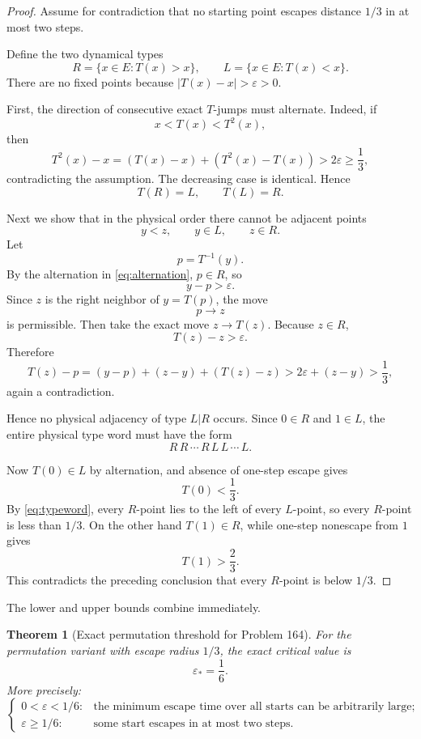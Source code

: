 \documentclass[11pt]{article}
\newtheorem{theorem}{Theorem}[section]
\newcommand{\eps}{\varepsilon}
\begin{document}
\begin{proof}
Assume for contradiction that no starting point escapes distance $1/3$ in at most two steps.

Define the two dynamical types
\[
R=\{x\in E:T(x)>x\},\qquad
L=\{x\in E:T(x)<x\}.
\]
There are no fixed points because $|T(x)-x|>\eps>0$.

First, the direction of consecutive exact $T$-jumps must alternate. Indeed, if
\[
x<T(x)<T^2(x),
\]
then
\[
T^2(x)-x
=
(T(x)-x)+(T^2(x)-T(x))
>2\eps\ge\frac13,
\]
contradicting the assumption. The decreasing case is identical. Hence
\begin{equation}\label{eq:alternation}
T(R)=L,\qquad T(L)=R.
\end{equation}

Next we show that in the physical order there cannot be adjacent points
\[
y<z,
\qquad y\in L,
\qquad z\in R.
\]
Let
\[
p=T^{-1}(y).
\]
By the alternation in \eqref{eq:alternation}, $p\in R$, so
\[
y-p>\eps.
\]
Since $z$ is the right neighbor of $y=T(p)$, the move
\[
p\longrightarrow z
\]
is permissible. Then take the exact move $z\to T(z)$. Because $z\in R$,
\[
T(z)-z>\eps.
\]
Therefore
\[
T(z)-p
=
(y-p)+(z-y)+(T(z)-z)
>2\eps+(z-y)
>\frac13,
\]
again a contradiction.

Hence no physical adjacency of type $L|R$ occurs. Since $0\in R$ and $1\in L$, the entire physical type word must have the form
\begin{equation}\label{eq:typeword}
R\,R\,\cdots\,R\,L\,L\,\cdots\,L.
\end{equation}

Now $T(0)\in L$ by alternation, and absence of one-step escape gives
\[
T(0)<\frac13.
\]
By \eqref{eq:typeword}, every $R$-point lies to the left of every $L$-point, so every $R$-point is less than $1/3$. On the other hand $T(1)\in R$, while one-step nonescape from $1$ gives
\[
T(1)>\frac23.
\]
This contradicts the preceding conclusion that every $R$-point is below $1/3$.
\end{proof}

The lower and upper bounds combine immediately.

\begin{theorem}[Exact permutation threshold for Problem 164]\label{thm:exact-threshold}
For the permutation variant with escape radius $1/3$, the exact critical value is
\[
\boxed{\eps_*=\frac16.}
\]
More precisely:
\[
\begin{cases}
0<\eps<1/6:&\text{the minimum escape time over all starts can be arbitrarily large};\\
\eps\ge1/6:&\text{some start escapes in at most two steps}.
\end{cases}
\]
\end{theorem}
\end{document}

